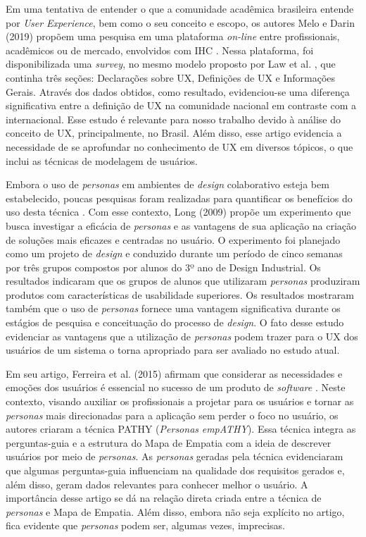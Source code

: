 \documentclass[12pt]{article}
\begin{document}
\par Em uma tentativa de entender o que a comunidade acadêmica brasileira entende por \emph{User Experience}, bem como o seu conceito e escopo, os autores Melo e Darin (2019) propõem uma pesquisa em uma plataforma \emph{on-line} entre profissionais, acadêmicos ou de mercado, envolvidos com IHC \cite{10.1145/3357155.3358444}. Nessa plataforma, foi disponibilizada uma \emph{survey}, no mesmo modelo proposto por Law et al. \cite{10.1145/1518701.1518813}, que continha três seções: Declarações sobre UX, Definições de UX e Informações Gerais. Através dos dados obtidos, como resultado, evidenciou-se uma diferença significativa entre a definição de UX na comunidade nacional em contraste com a internacional. Esse estudo é relevante para nosso trabalho devido à análise do conceito de UX, principalmente, no Brasil. Além disso, esse artigo evidencia a necessidade de se aprofundar no conhecimento de UX em diversos tópicos, o que inclui as técnicas de modelagem de usuários.

\par Embora o uso de \emph{personas} em ambientes de \emph{design} colaborativo esteja bem estabelecido, poucas pesquisas foram realizadas para quantificar os benefícios do uso desta técnica \cite{long_study}. Com esse contexto, Long (2009) propõe um experimento que busca investigar a eficácia de \emph{personas} e as vantagens de sua aplicação na criação de soluções mais eficazes e centradas no usuário. O experimento foi planejado como um projeto de \emph{design} e conduzido durante um período de cinco semanas por três grupos compostos por alunos do 3º ano de Design Industrial. Os resultados indicaram que os grupos de alunos que utilizaram \emph{personas} produziram produtos com características de usabilidade superiores. Os resultados mostraram também que o uso de \emph{personas} fornece uma vantagem significativa durante os estágios de pesquisa e conceituação do processo de \emph{design}. O fato desse estudo evidenciar as vantagens que a utilização de \emph{personas} podem trazer para o UX dos usuários de um sistema o torna apropriado para ser avaliado no estudo atual.

\par Em seu artigo, Ferreira et al. (2015) afirmam que considerar as necessidades e emoções dos usuários é essencial no sucesso de um produto de \emph{software} \cite{7328012}. Neste contexto, visando auxiliar os profissionais a projetar para os usuários e tornar as \emph{personas} mais direcionadas para a aplicação sem perder o foco no usuário, os autores criaram a técnica PATHY (\emph{Personas} \emph{empATHY}). Essa técnica integra as perguntas-guia e a estrutura do Mapa de Empatia com a ideia de descrever usuários por meio de \emph{personas}. As \emph{personas} geradas pela técnica evidenciaram que algumas perguntas-guia influenciam na qualidade dos requisitos gerados e, além disso, geram dados relevantes para conhecer melhor o usuário. A importância desse artigo se dá na relação direta criada entre a técnica de \emph{personas} e Mapa de Empatia. Além disso, embora não seja explícito no artigo, fica evidente que \emph{personas} podem ser, algumas vezes, imprecisas.
\end{document}
